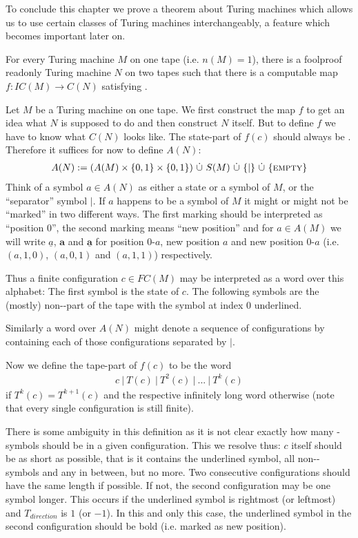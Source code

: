 To conclude this chapter we prove a theorem about Turing machines which allows us to use certain classes of Turing machines interchangeably, a feature which becomes important later on.
\begin{Theorem}
	For every Turing machine $M$ on one tape (i.e. $n(M) = 1$), there is a foolproof readonly Turing machine $N$ on two tapes such that
	there is a computable map $f: IC(M) \to C(N)$
	satisfying .
\end{Theorem}
\proof
	Let $M$ be a Turing machine on one tape.
	We first construct the map $f$ to get an idea what $N$ is supposed to do and then construct $N$ itself.
	But to define $f$ we have to know what $C(N)$ looks like.
	The state-part of $f(c)$ should always be \INI. Therefore it suffices for now to define $A(N)$:
	\begin{align*}
		A(N) := (A(M) \times \{0,1\} \times \{0,1\})~\dot\cup~S(M)~\dot\cup~\{|\}~\dot\cup~\{\text{\scshape{empty}}\}
	\end{align*}
	Think of a symbol $a \in A(N)$ as either a state or a symbol of $M$, or the ``separator'' symbol $|$.
	If $a$ happens to be a symbol of $M$ it might or might not be ``marked'' in two different ways.
	The first marking should be interpreted as ``position $0$'', the second marking means ``new position''
	and for $a \in A(M)$ we will write
	$\underline{a}$, $\boldsymbol{a}$ and $\underline{\boldsymbol{a}}$ for position $0$-$a$, new position $a$ and new position $0$-$a$ (i.e. $(a,1,0)$, $(a,0,1)$ and $(a,1,1)$) respectively.

	Thus a finite configuration $c \in FC(M)$ may be interpreted as a word over this alphabet:
	The first symbol is the state of $c$. The following symbols are the (mostly) non-\EMP-part of the tape with the symbol at index $0$ underlined.

	Similarly a word over $A(N)$ might denote a sequence of configurations by containing each of those configurations separated by $|$.

	Now we define the tape-part of $f(c)$ to be the word
	\begin{align*}
		c~|~T(c)~|~T^2(c)~|~...~|~T^k(c)
	\end{align*}
	if $T^k(c) = T^{k+1}(c)$ and the respective infinitely long word otherwise (note that every single configuration is still finite).

	There is some ambiguity in this definition as it is not clear exactly how many \EMP-symbols should be in a given configuration.
	This we resolve thus: $c$ itself should be as short as possible, that is it contains the underlined symbol, all non-\EMP-symbols and any \EMP in between, but no more.
	Two consecutive configurations should have the same length if possible. If not, the second configuration may be one symbol longer.
	This occurs if the underlined symbol is rightmost (or leftmost) and $T_{direction}$ is $1$ (or $-1$).
	In this and only this case, the underlined symbol in the second configuration should be bold (i.e. marked as new position).


\newpage


\endproof
